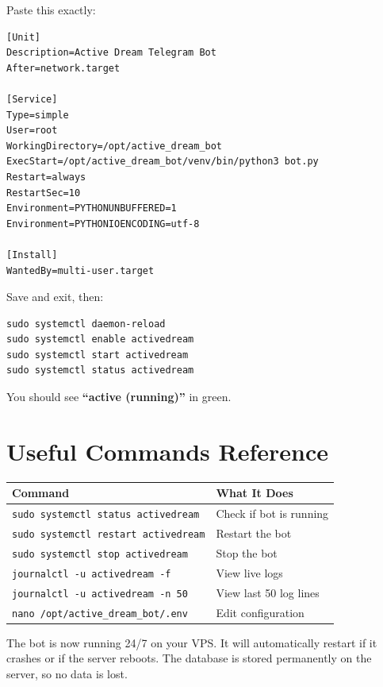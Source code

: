 Paste this exactly:

\begin{lstlisting}[style=envstyle, title={activedream.service}]
[Unit]
Description=Active Dream Telegram Bot
After=network.target

[Service]
Type=simple
User=root
WorkingDirectory=/opt/active_dream_bot
ExecStart=/opt/active_dream_bot/venv/bin/python3 bot.py
Restart=always
RestartSec=10
Environment=PYTHONUNBUFFERED=1
Environment=PYTHONIOENCODING=utf-8

[Install]
WantedBy=multi-user.target
\end{lstlisting}

Save and exit, then:

\begin{lstlisting}[style=termstyle, title={Start the service}]
sudo systemctl daemon-reload
sudo systemctl enable activedream
sudo systemctl start activedream
sudo systemctl status activedream
\end{lstlisting}

You should see \textbf{``active (running)''} in green.

\section{Useful Commands Reference}

\begin{table}[H]
\centering
\begin{tabularx}{\textwidth}{|l|X|}
\hline
\textbf{Command} & \textbf{What It Does} \\
\hline
\texttt{sudo systemctl status activedream} & Check if bot is running \\
\hline
\texttt{sudo systemctl restart activedream} & Restart the bot \\
\hline
\texttt{sudo systemctl stop activedream} & Stop the bot \\
\hline
\texttt{journalctl -u activedream -f} & View live logs \\
\hline
\texttt{journalctl -u activedream -n 50} & View last 50 log lines \\
\hline
\texttt{nano /opt/active\_dream\_bot/.env} & Edit configuration \\
\hline
\end{tabularx}
\end{table}

\begin{successbox}
The bot is now running 24/7 on your VPS. It will automatically restart if it crashes or if the server reboots. The database is stored permanently on the server, so no data is lost.
\end{successbox}

